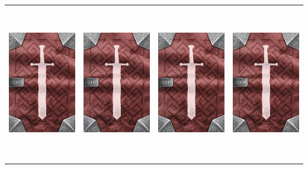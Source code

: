 \documentclass{minimal}
\begin{document}
{\begin{longtable}{llll}
\includegraphics[width=44mm,height=68mm]{./64-151/gh-133-resonant-crystal-back.png} &
\includegraphics[width=44mm,height=68mm]{./64-151/gh-132-power-core-back.png} &
\includegraphics[width=44mm,height=68mm]{./64-151/gh-131-heart-of-the-betrayer-back.png} &
\includegraphics[width=44mm,height=68mm]{./64-151/gh-130-helix-ring-back.png}\\ 

\end{longtable}}
\end{document}
